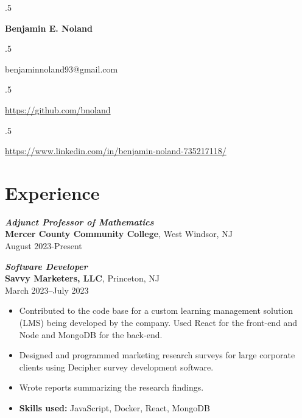 \documentclass[letterpaper,12pt]{article}
\begin{document}
\moveleft.5\hoffset\centerline{\Large\bf Benjamin E. Noland}
\smallskip
\moveleft.5\hoffset\centerline{benjaminnoland93@gmail.com}
\moveleft.5\hoffset\centerline{\url{https://github.com/bnoland}}
\moveleft.5\hoffset\centerline{\url{https://www.linkedin.com/in/benjamin-noland-735217118/}}

\iffalse
  \section*{Skills}
  \begin{itemize}
    \item \textbf{Proficient:} Applied statistics and machine learning, R,
          Python, C, Java, \LaTeX, Linux, Git, Google Cloud Platform
    \item \textbf{Experience:} Amazon Web Services, MATLAB, Stata, C++, CMake,
          JavaScript, HTML, CSS, PHP, MySQL, x86 assembly language, Rust
  \end{itemize}
\fi

\section*{Experience}

\textit{\textbf{Adjunct Professor of Mathematics}} \\
\textbf{Mercer County Community College}, West Windsor, NJ \\
August 2023-Present
\bigskip

\textit{\textbf{Software Developer}} \\
\textbf{Savvy Marketers, LLC}, Princeton, NJ \\
March 2023--July 2023
\begin{itemize}
  \item Contributed to the code base for a custom learning management solution
        (LMS) being developed by the company. Used React for the front-end and
        Node and MongoDB for the back-end.
  \item Designed and programmed marketing research surveys for large corporate
        clients using Decipher survey development software.
  \item Wrote reports summarizing the research findings.
  \item \textbf{Skills used:} JavaScript, Docker, React, MongoDB
\end{itemize}
\end{document}
